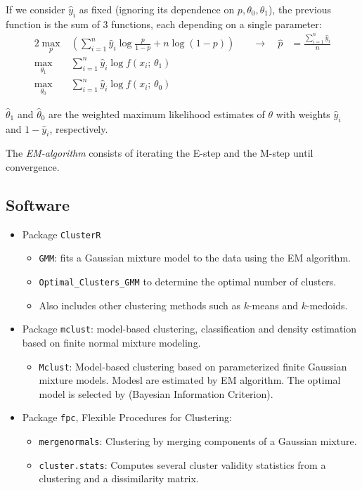 If we consider $\hat{y}_i$ as fixed (ignoring its dependence on $p, \theta_0, \theta_1$), the
previous function is the sum of 3 functions, each depending on a single parameter:
\begin{alignat*}{2}
	\max_{p}        & \left( \sum_{i=1}^n \hat{y}_i \log \frac{p}{1-p} + n \log (1 - p) \right) & \quad \rightarrow{} \quad
	\hat{p}         & = \frac{\sum_{i=1}^n \hat{y}_i}{n}                                                                    \\
	\max_{\theta_1} & \sum_{i=1}^n \hat{y}_i \log f(x_i;\,\theta_1)                                                         \\
	\max_{\theta_0} & \sum_{i=1}^n \hat{y}_i \log f(x_i;\,\theta_0)
\end{alignat*}

$\hat{\theta}_1$ and $\hat{\theta}_0$ are the weighted maximum likelihood estimates
of $\theta$ with weights $\hat{y}_i$ and $1 - \hat{y}_i$, respectively.

\begin{marker}
	The \emph{EM-algorithm} consists of iterating the E-step and the M-step until convergence.
\end{marker}

\subsection{Software}
\begin{itemize}
	\item Package \texttt{ClusterR}
	      \begin{itemize}
		      \item \texttt{GMM}: fits a Gaussian mixture model to the data using the EM algorithm.
		      \item \texttt{Optimal\_Clusters\_GMM} to determine the optimal number of clusters.
		      \item Also includes other clustering methods such as $k$-means and $k$-medoids.
	      \end{itemize}
	\item Package \texttt{mclust}: model-based clustering, classification and density estimation
	      based on finite normal mixture modeling.
	      \begin{itemize}
		      \item \texttt{Mclust}: Model-based clustering based on parameterized finite
		            Gaussian mixture models. Modesl are estimated by EM algorithm. The optimal
		            model is selected by  (Bayesian Information Criterion).
	      \end{itemize}
	\item Package \texttt{fpc}, Flexible Procedures for Clustering:
	      \begin{itemize}
		      \item \texttt{mergenormals}: Clustering by merging components of a Gaussian mixture.
		      \item \texttt{cluster.stats}: Computes several cluster validity statistics from a
		            clustering and a dissimilarity matrix.
	      \end{itemize}
\end{itemize}

